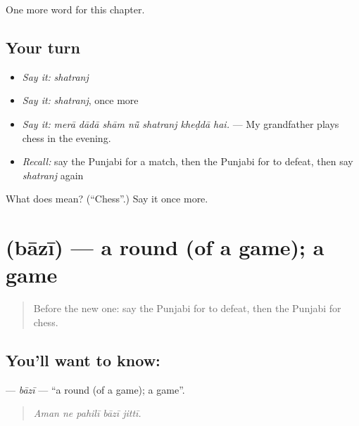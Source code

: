 \begin{grammarlens}[title={What you've built}]
One more word for this chapter.
\end{grammarlens}

\subsection*{Your turn}
\begin{itemize}
\raggedright
  \item \emph{Say it:} \emph{shatranj}
  \item \emph{Say it:} \emph{shatranj}, once more
  \item \emph{Say it:} \emph{merā dādā shām nū̃ shatranj kheḍdā hai.} — My grandfather plays chess in the evening.
  \item \emph{Recall:} say the Punjabi for a match, then the Punjabi for to defeat, then say \emph{shatranj} again
\end{itemize}

\begin{tcolorbox}[breakable,colback=teal!4,colframe=teal!35!black,title={Before you move on}]
What does  mean? (\textquotedblleft{}Chess\textquotedblright{}.) Say it once more.
\end{tcolorbox}
\section[\texorpdfstring{\pa{ਬਾਜ਼ੀ} (bāzī)}{ਬਾਜ਼ੀ (bāzī)}]{ (bāzī) — a round (of a game); a game}

\label{lesson:PA-C352-bazi}



\begin{quote}
Before the new one: say the Punjabi for to defeat, then the Punjabi for chess.
\end{quote}

\subsection*{You'll want to know: }
\textbf{} — \emph{bāzī} — \textquotedblleft{}a round (of a game); a game\textquotedblright{}.

\begin{quote}
    
\end{quote}

\begin{quote}
\emph{Aman ne pahilī bāzī jittī.}
\end{quote}

